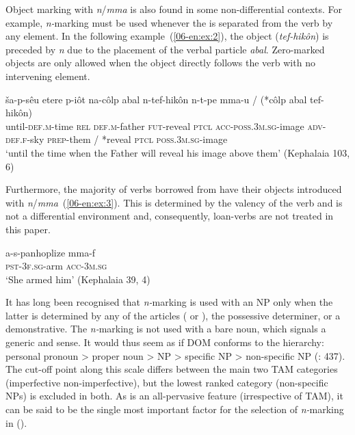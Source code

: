 \documentclass[output=paper]{LSP/langsci}
\begin{document}
Object marking with \textit{n}/\textit{mma} is also found in some non-differential contexts. For example, \textit{n-}marking must be used whenever the  is separated from the verb by any element. In the following example~(\ref{06-en:ex:2}), the object (\textit{tef-hikôn}) is preceded by \textit{n} due to the placement of the verbal particle \textit{abal}. Zero-marked objects are only allowed when the object directly follows the verb with no intervening element.

\begin{exe}
\ex \label{06-en:ex:2}
\gll ša-p-sêu  etere  p-iôt  na-côlp  abal n-tef-hikôn  n-t-pe  mma-u / (*côlp abal tef-hikôn)\\
	until-\textsc{def.m-}time \textsc{rel} \textsc{def.m-}father \textsc{fut-}reveal \textsc{ptcl} \textsc{acc-}\textsc{poss.3m.sg-}image \textsc{adv-}\textsc{def.f-}sky \textsc{prep-}them / *reveal \textsc{ptcl} \textsc{poss.3m.sg-}image\\
\glt ‘until the time when the Father will reveal his image above them’ (Kephalaia 103, 6)

\end{exe}

Furthermore, the majority of verbs borrowed from  have their objects introduced with \textit{n}/\textit{mma}~(\ref{06-en:ex:3}). This is determined by the valency of the verb and is not a differential environment and, consequently,  loan-verbs are not treated in this paper. 

\begin{exe}
\ex \label{06-en:ex:3}
\gll a-s-panhoplize mma-f\\
	\textsc{pst-3f.sg-}arm \textsc{acc-3m.sg}\\
\glt ‘She armed him’ (Kephalaia 39, 4)
\end{exe}

It has long been recognised that \textit{n-}marking is used with an NP only when the latter is determined by any of the articles ( or ), the possessive determiner, or a demonstrative. The \textit{n-}marking is not used with a bare noun, which signals a generic and  sense. It would thus seem as if  DOM conforms to the  hierarchy: personal pronoun > proper noun >  NP >  specific NP > non-specific NP (\eg \citealt{Aissen2003Differential}: 437). The cut-off point along this scale differs between the main two TAM categories (imperfective \vs non-imperfective), but the lowest ranked category (non-specific NPs) is excluded in both. As  is an all-pervasive feature (irrespective of TAM), it can be said to be the single most important factor for the selection of \textit{n-}marking in  (\cf \citealt[309]{Sinnemki2014Typological}).
\end{document}
